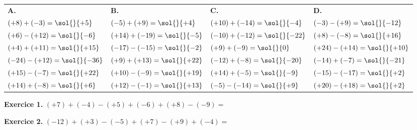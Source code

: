 

{\small
\bigskip
\def\arraystretch{1.7}
\begin{tabularx}{\linewidth}{*{4}{X}}
\textbf{A.} & \textbf{B.} & \textbf{C.} & \textbf{D.} \\
$(+8)+(-3)= \sol{\dotfill}{+5}$   & $(-5)+(+9)= \sol{\dotfill}{+4}$   & $(+10)+(-14)= \sol{\dotfill}{-4}$ & $(-3)-(+9)= \sol{\dotfill}{-12}$   \\
$(+6)-(+12)= \sol{\dotfill}{-6}$  & $(+14)+(-19)= \sol{\dotfill}{-5}$ & $(-10)+(-12)= \sol{\dotfill}{-22}$ & $(+8)-(-8)= \sol{\dotfill}{+16}$   \\
$(+4)+(+11)= \sol{\dotfill}{+15}$  & $(-17)-(-15)= \sol{\dotfill}{-2}$ & $(+9)+(-9)= \sol{\dotfill}{0}$   & $(+24)-(+14)= \sol{\dotfill}{+10}$ \\
$(-24)-(+12)= \sol{\dotfill}{-36}$ & $(+9)+(+13)= \sol{\dotfill}{+22}$  & $(-12)+(-8)= \sol{\dotfill}{-20}$  & $(-14)+(-7)= \sol{\dotfill}{-21}$  \\
$(+15)-(-7)= \sol{\dotfill}{+22}$  & $(+10)-(-9)= \sol{\dotfill}{+19}$  & $(+14)+(-5)= \sol{\dotfill}{-9}$  & $(-15)-(-17)= \sol{\dotfill}{+2}$ \\
$(+14)+(-8)= \sol{\dotfill}{+6}$  & $(+12)-(-1)= \sol{\dotfill}{+13}$  & $(-5)-(-14)= \sol{\dotfill}{+9}$  & $(+20)-(+18)= \sol{\dotfill}{+2}$ \\
\end{tabularx}
}


{\bfseries\color{themeColor}Exercice 1.} \quad$(+7) + (−4)−(+5) + (−6) + (+8)−(−9) =$


{\bfseries\color{themeColor}Exercice 2.} \quad$(−12) + (+3)−(−5) + (+7)−(+9) + (−4) =$



